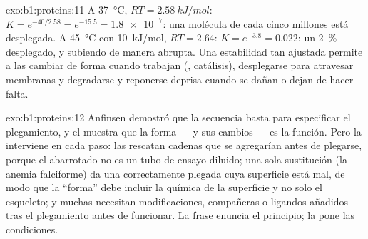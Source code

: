 \begin{solution}{exo:b1:proteins:11}
A \qty{37}{\celsius}, $RT = \qty{2.58}{kJ/mol}$: $K = e^{-40/2.58} =
e^{-15.5} = \num{1.8e-7}$: una molécula de cada cinco millones está
desplegada. A \qty{45}{\celsius} con \qty{10}{kJ/mol}, $RT = 2.64$:
$K = e^{-3.8} =
0.022$: un \qty{2}{\%} desplegado, y subiendo de manera
abrupta. Una estabilidad tan ajustada permite a las  cambiar de
forma cuando trabajan (, catálisis), desplegarse para atravesar
membranas y degradarse y reponerse deprisa cuando se dañan o dejan de hacer
falta.
\end{solution}

\begin{solution}{exo:b1:proteins:12}
Anfinsen demostró que la secuencia basta para especificar el plegamiento, y
el  muestra que la forma --- y sus cambios --- es la función.
Pero la  interviene en cada paso: las  rescatan cadenas que
se agregarían antes de plegarse, porque el  abarrotado no es un tubo
de ensayo diluido; una sola sustitución (la anemia falciforme) da una
 correctamente plegada cuya superficie está mal, de modo que la
``forma'' debe incluir la química de la superficie y no solo el esqueleto; y
muchas  necesitan modificaciones, compañeras o ligandos añadidos
tras el plegamiento antes de funcionar. La frase enuncia el principio; la
 pone las condiciones.
\end{solution}

